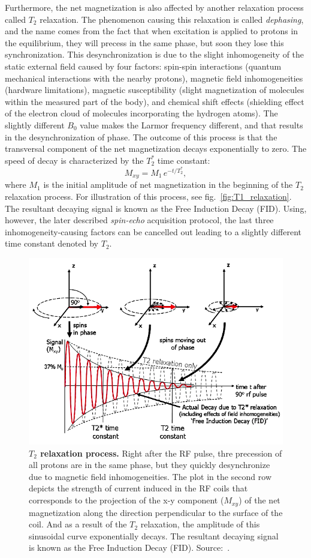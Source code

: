 Furthermore, the net magnetization is also affected by another relaxation process called $T_2$ relaxation. The phenomenon causing this relaxation is called \textit{dephasing}, and the name comes from the fact that when excitation is applied to protons in the equilibrium, they will precess in the same phase, but soon they lose this synchronization. This desynchronization is due to the slight inhomogeneity of the static external field caused by four factors: spin-spin interactions (quantum mechanical interactions with the nearby protons), magnetic field inhomogeneities (hardware limitations), magnetic susceptibility (slight magnetization of molecules within the measured part of the body), and chemical shift effects (shielding effect of the electron cloud of molecules incorporating the hydrogen atoms). The slightly different $B_0$ value makes the Larmor frequency different, and that results in the desynchronization of phase. The outcome of this process is that the transversal component of the net magnetization decays exponentially to zero. The speed of decay is characterized by the $T_2^*$ time constant:
\[M_{xy} = M_1\,e^{-t/T_2^*},\]
where $M_1$ is the initial amplitude of net magnetization in the beginning of the $T_2$ relaxation process. For illustration of this process, see fig.~\ref{fig:T1_relaxation}. The resultant decaying signal is known as the Free Induction Decay (FID). Using, however, the later described \textit{spin-echo} acquisition protocol, the last three inhomogeneity-causing factors can be cancelled out leading to a slightly different time constant denoted by $T_2$.

\begin{figure}[tb]
    \centering
    \includegraphics[width=0.8\linewidth]{images/T2_relaxation.png}
    \caption{\textbf{$T_2$ relaxation process.} Right after the RF pulse, thre precession of all protons are in the same phase, but they quickly desynchronize due to magnetic field inhomogeneities. The plot in the second row depicts the strength of current induced in the RF coils that corresponds to the projection of the x-y component ($M_{xy}$) of the net magnetization along the direction perpendicular to the surface of the coil. And as a result of the $T_2$ relaxation, the amplitude of this sinusoidal curve exponentially decays. The resultant decaying signal is known as the Free Induction Decay (FID). Source:~\cite{ridgway_cardiovascular_2010}.}
    \label{fig:T2_relaxation}
\end{figure}

